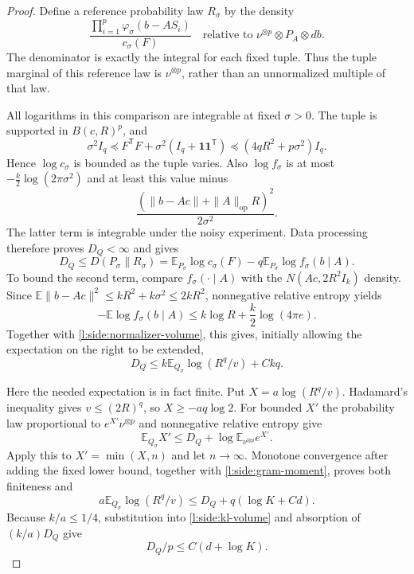 \begin{proof}
Define a reference probability law $R_\sigma$ by the density
\begin{equation}\label{l:side:reference-density}
 \frac{\prod_{i=1}^p\varphi_\sigma(b-AS_i)}{c_\sigma(F)}
 \quad\text{relative to }\nu^{\otimes p}\otimes P_A\otimes db.
\end{equation}
The denominator is exactly the integral for each fixed tuple.  Thus
the tuple marginal of this reference law is $\nu^{\otimes p}$, rather
than an unnormalized multiple of that law.

All logarithms in this comparison are integrable at fixed $\sigma>0$.
The tuple is supported in $B(c,R)^p$, and
\[
 \sigma^2I_q\preceq F^{\mathsf T}F+
       \sigma^2(I_q+\mathbf1\mathbf1^{\mathsf T})
 \preceq(4qR^2+p\sigma^2)I_q.
\]
Hence $\log c_\sigma$ is bounded as the tuple varies.  Also
$\log f_\sigma$ is at most $-\frac{k}{2}\log(2\pi\sigma^2)$ and at
least this value minus
\[
 \frac{(\|b-Ac\|+\|A\|_{\mathrm{op}}R)^2}{2\sigma^2}.
\]
The latter term is integrable under the noisy experiment.  Data processing
therefore proves $D_Q<\infty$ and gives
\begin{equation}\label{l:side:kl-comparison}
 D_Q\le D(P_\sigma\|R_\sigma)
 =\mathbb E_{P_\sigma}\log c_\sigma(F)
       -q\mathbb E_{P_\sigma}\log f_\sigma(b\mid A).
\end{equation}
To bound the second term, compare $f_\sigma(\cdot\mid A)$ with the
$N(Ac,2R^2I_k)$ density.  Since
$\mathbb E\|b-Ac\|^2\le kR^2+k\sigma^2\le2kR^2$, nonnegative
relative entropy yields
\[
 -\mathbb E\log f_\sigma(b\mid A)
 \le k\log R+\frac{k}{2}\log(4\pi e).
\]
Together with \eqref{l:side:normalizer-volume}, this gives, initially
allowing the expectation on the right to be extended,
\begin{equation}\label{l:side:kl-volume}
 D_Q\le k\mathbb E_{Q_\sigma}\log(R^q/v)+Ckq.
\end{equation}

Here the needed expectation is in fact finite.  Put
$X=a\log(R^q/v)$.  Hadamard's inequality gives $v\le(2R)^q$, so
$X\ge-aq\log2$.  For bounded $X'$ the probability law proportional to
$e^{X'}\nu^{\otimes p}$ and nonnegative relative entropy give
\[
 \mathbb E_{Q_\sigma}X'
 \le D_Q+\log\mathbb E_{\nu^{\otimes p}}e^{X'}.
\]
Apply this to $X'=\min(X,n)$ and let $n\to\infty$.  Monotone convergence
after adding the fixed lower bound, together with
\eqref{l:side:gram-moment}, proves both finiteness and
\[
 a\mathbb E_{Q_\sigma}\log(R^q/v)
 \le D_Q+q(\log K+Cd).
\]
Because $k/a\le1/4$, substitution into \eqref{l:side:kl-volume} and
absorption of $(k/a)D_Q$ give
\begin{equation}\label{l:side:kl-absorption}
 D_Q/p\le C(d+\log K).
\end{equation}


\end{proof}
